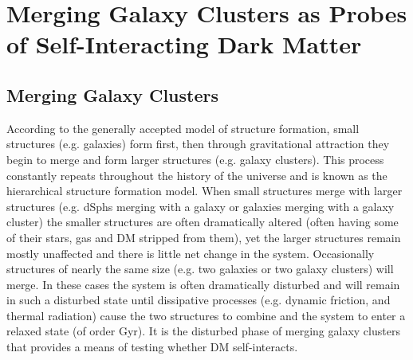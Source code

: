 \section{Merging Galaxy Clusters as Probes of Self-Interacting Dark Matter}\label{section:MergingClustersSIDMprobe}

\subsection{Merging Galaxy Clusters}\label{Section:MergingClusters}

According to the generally accepted model of structure formation, small structures (e.g. galaxies) form first, then through gravitational attraction they begin to merge and form larger structures (e.g. galaxy clusters).
This process constantly repeats throughout the history of the universe and is known as the hierarchical structure formation model.
When small structures merge with larger structures (e.g. dSphs merging with a galaxy or galaxies merging with a galaxy cluster) the smaller structures are often dramatically altered (often having some of their stars, gas and DM stripped from them), yet the larger structures remain mostly unaffected and there is little net change in the system.
Occasionally structures of nearly the same size (e.g. two galaxies or two galaxy clusters) will merge.
In these cases the system is often dramatically disturbed and will remain in such a disturbed state until dissipative processes (e.g. dynamic friction, and thermal radiation) cause the two structures to combine and the system to enter a relaxed state (of order Gyr).
It is the disturbed phase of merging galaxy clusters that provides a means of testing whether DM self-interacts.

